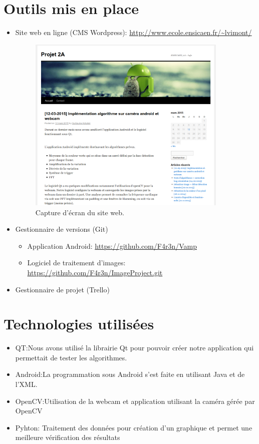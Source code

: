 \section{Outils mis en place}

\begin{itemize}
	\item Site web en ligne (CMS Wordpress): \url{http://www.ecole.ensicaen.fr/~lvimont/} 

		\begin{figure}[h!]
			\centering
			\includegraphics[width=0.9\textwidth]{data/website.png}
			\caption{Capture d'écran du site web.}
		\end{figure}

	\item Gestionnaire de versions (Git) 
		\begin{itemize}[label=\textbullet]
			\item Application Android: \url{https://github.com/F4r3n/Vamp} 
			\item Logiciel de traitement d'images: \url{https://github.com/F4r3n/ImageProject.git} 
		\end{itemize}
	\item Gestionnaire de projet (Trello)
\end{itemize}

\section{Technologies utilisées}

\begin{itemize}[label=\textbullet]
	\item QT:Nous avons utilisé la librairie Qt pour pouvoir créer notre application qui permettait de tester les algorithmes.
	\item Android:La programmation sous Android s'est faite en utilisant Java et de l'XML.
	\item OpenCV:Utilisation de la webcam et application utilisant la caméra gérée  par OpenCV
	\item Pyhton: Traitement des données pour création d'un graphique et permet une meilleure vérification des résultats
\end{itemize}

